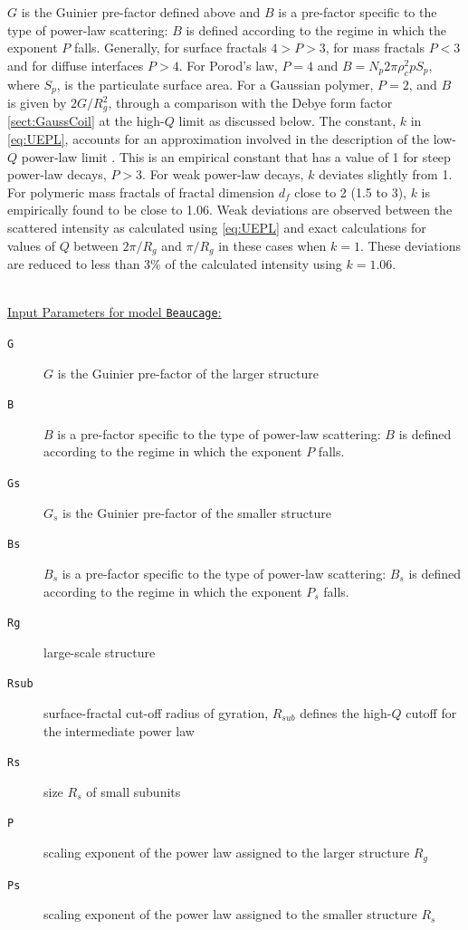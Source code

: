 $G$ is the Guinier pre-factor defined above and $B$ is a
pre-factor specific to the type of power-law scattering:
$B$ is defined according to the regime in which the exponent
$P$ falls. Generally, for surface fractals $4 > P > 3$,
for mass fractals $P < 3$ and for diffuse interfaces $P>4$.
For Porod's law, $P=4$
and $B = N_p 2\pi \rho_c^2pS_p$, where $S_p$, is the particulate surface
area. For a Gaussian polymer, $P = 2$, and $B$ is given by
$2G/R_g^2$, through a comparison with the Debye form factor \ref{sect:GaussCoil}
at the high-$Q$ limit as discussed below.
The constant, $k$ in \ref{eq:UEPL}, accounts for
an approximation involved in the description of the low-$Q$
power-law limit \cite{beaucage95}. This is an empirical
constant that has a value of 1 for steep power-law decays,
$P > 3$. For weak power-law decays, $k$ deviates slightly
from 1. For polymeric mass fractals of fractal dimension
$d_f$ close to 2 (1.5 to 3), $k$ is empirically found to be close
to 1.06. Weak deviations are observed between the scattered
intensity as calculated using \ref{eq:UEPL} and exact
calculations for values of $Q$ between $2\pi/R_g$ and $\pi/R_g$ in
these cases when $k = 1$. These deviations are reduced to
less than 3\% of the calculated intensity using $k= 1.06$.

\hspace{1pt}\\
\uline{Input Parameters for model \texttt{Beaucage}:}\\
\begin{description}
\item[\texttt{G}] $G$ is the Guinier pre-factor of the larger structure
\item[\texttt{B}] $B$ is a pre-factor specific to the type of power-law scattering:
$B$ is defined according to the regime in which the exponent $P$ falls.
\item[\texttt{Gs}] $G_s$ is the Guinier pre-factor of the smaller structure
\item[\texttt{Bs}] $B_s$ is a pre-factor specific to the type of power-law scattering:
$B_s$ is defined according to the regime in which the exponent $P_s$ falls.
\item[\texttt{Rg}] large-scale structure
\item[\texttt{Rsub}] surface-fractal cut-off radius of gyration,
$R_{sub}$ defines the high-$Q$ cutoff for the intermediate power law
\item[\texttt{Rs}] size $R_s$ of small subunits
\item[\texttt{P}] scaling exponent of the power law assigned to the larger structure $R_g$
\item[\texttt{Ps}] scaling exponent of the power law assigned to the smaller structure $R_s$
\end{description}


